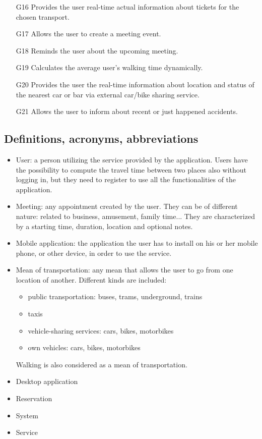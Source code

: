 \documentclass[12pt, a4paper]{article}
\begin{document}
\begin{itemize}
	\item [G16] Provides the user real-time actual information about tickets for the chosen transport.
	
	\item [G17] Allows the user to create a meeting event.
	
	\item [G18] Reminds the user about the upcoming meeting.
	
	\item [G19] Calculates the average user's walking time dynamically. 
	
	\item [G20] Provides the user the real-time information about location  and status of the nearest car or bar via external car/bike sharing service.
	
	\item [G21] Allows the user to inform about recent or just happened accidents.
\end{itemize}

\subsection{Definitions, acronyms, abbreviations}
\begin{itemize}
	\item User: a person utilizing the service provided by the application. Users have the possibility to compute the travel time between two places also without logging in, but they need to register to use all the functionalities of the application.
	\item Meeting: any appointment created by the user. They can be of different nature: related to business, amusement, family time... They are characterized by a starting time, duration, location and optional notes.
	\item Mobile application: the application the user has to install on his or her mobile phone, or other device, in order to use the service.
	\item Mean of transportation: any mean that allows the user to go from one location of another. Different kinds are included:
	\begin{itemize}
		\item public transportation: buses, trams, underground, trains
		\item taxis
		\item vehicle-sharing services: cars, bikes, motorbikes
		\item own vehicles: cars, bikes, motorbikes 
	\end{itemize}
Walking is also considered as a mean of transportation.
	\item Desktop application
	\item Reservation
	\item System
	\item Service
\end{itemize}
\end{document}

